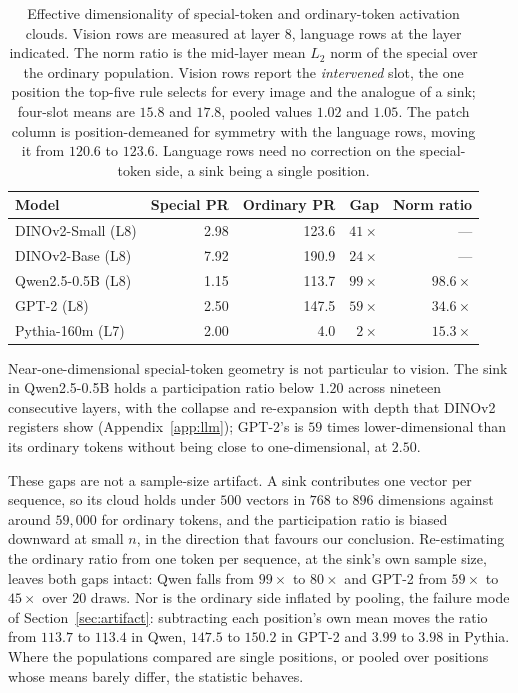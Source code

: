 \documentclass{article}
\begin{document}
\begin{table}[t]
\centering
\caption{Effective dimensionality of special-token and ordinary-token activation clouds. Vision rows are measured at layer 8, language rows at the layer indicated. The norm ratio is the mid-layer mean $L_2$ norm of the special over the ordinary population. Vision rows report the \emph{intervened} slot, the one position the top-five rule selects for every image and the analogue of a sink; four-slot means are $15.8$ and $17.8$, pooled values $1.02$ and $1.05$. The patch column is position-demeaned for symmetry with the language rows, moving it from $120.6$ to $123.6$. Language rows need no correction on the special-token side, a sink being a single position.}
\label{tab:generality}
\begin{tabular}{lrrrr}
\toprule
Model & Special PR & Ordinary PR & Gap & Norm ratio \\
\midrule
DINOv2-Small (L8)   & 2.98 & 123.6 & $41\times$  & --- \\
DINOv2-Base (L8)    & 7.92 & 190.9 & $24\times$ & --- \\
Qwen2.5-0.5B (L8)   & 1.15 & 113.7 & $99\times$  & $98.6\times$ \\
GPT-2 (L8)          & 2.50 & 147.5 & $59\times$  & $34.6\times$ \\
Pythia-160m (L7)    & 2.00 & 4.0   & $2\times$   & $15.3\times$ \\
\bottomrule
\end{tabular}
\end{table}

Near-one-dimensional special-token geometry is not particular to vision. The sink in Qwen2.5-0.5B holds a participation ratio below $1.20$ across nineteen consecutive layers, with the collapse and re-expansion with depth that DINOv2 registers show (Appendix~\ref{app:llm}); GPT-2's is $59$ times lower-dimensional than its ordinary tokens without being close to one-dimensional, at $2.50$.

These gaps are not a sample-size artifact. A sink contributes one vector per sequence, so its cloud holds under $500$ vectors in $768$ to $896$ dimensions against around $59{,}000$ for ordinary tokens, and the participation ratio is biased downward at small $n$, in the direction that favours our conclusion. Re-estimating the ordinary ratio from one token per sequence, at the sink's own sample size, leaves both gaps intact: Qwen falls from $99\times$ to $80\times$ and GPT-2 from $59\times$ to $45\times$ over $20$ draws. Nor is the ordinary side inflated by pooling, the failure mode of Section~\ref{sec:artifact}: subtracting each position's own mean moves the ratio from $113.7$ to $113.4$ in Qwen, $147.5$ to $150.2$ in GPT-2 and $3.99$ to $3.98$ in Pythia. Where the populations compared are single positions, or pooled over positions whose means barely differ, the statistic behaves.
\end{document}
